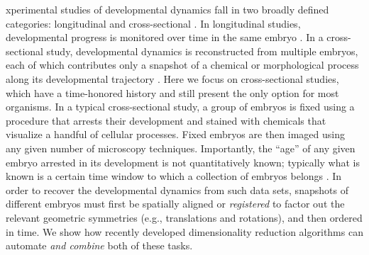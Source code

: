 \documentclass{pnastwo}
\begin{document}
\begin{article}






xperimental studies of developmental dynamics fall in two broadly defined categories: longitudinal and cross-sectional \cite{diggle2002analysis}.
%
In longitudinal studies, developmental progress is monitored over time in the same embryo \cite{roelens2013live, keller2013imaging}.
%
In a cross-sectional study, developmental dynamics is reconstructed from multiple embryos, each of which contributes only a snapshot of a chemical or morphological process along its developmental trajectory \cite{jaeger2004dynamic, peter2012predictive, peter2011gene, fowlkes2008quantitative}.
%
Here we focus on cross-sectional studies, which have a time-honored history and still present the only option for most organisms.
%
In a typical cross-sectional study, a group of embryos is fixed using a procedure that arrests their development and stained with chemicals that visualize a handful of cellular processes.
%
Fixed embryos are then imaged using any given number of microscopy techniques.
%
%
Importantly, the ``age'' of any given embryo arrested in its development is not quantitatively known; typically what is known is
a certain time window to which a collection of embryos belongs \cite{ng2012large, richardson2014emage, castro2009automatic}.
%
In order to recover the developmental dynamics from such data sets, snapshots of different embryos must first be spatially aligned or {\em registered} to factor out the relevant geometric symmetries (e.g., translations and rotations), and then ordered in time.
%
We show how recently developed dimensionality reduction algorithms can automate {\it and combine} both of these tasks.


\end{article}
\end{document}

